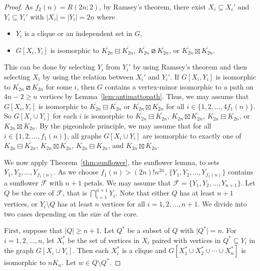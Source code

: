 \documentclass[11pt]{article}
\newcommand\abs[1]{\lvert #1\rvert}
\newcommand\mat{\boxminus}
\newcommand\tri{\boxslash}
\newcommand\antimat{\boxtimes}
\def\K_#1{{K_{#1}}}
\def\S_#1{\overline{K_{#1}}}
\begin{document}
\begin{proof}
    As $f_2(n)=R(2n;2)$, by Ramsey's theorem, there exist $X_i\subseteq X_i'$ and $Y_i\subseteq Y_i'$ with $\abs{X_i}=\abs{Y_i}=2n$ 
	where
	\begin{itemize}
	\item $Y_i$ is a clique or an independent set in $G$, 
        \item $G[X_i, Y_i]$ is isomorphic to $\S_{2n}\mat\S_{2n}$, $\S_{2n}\tri \S_{2n}$, or
     $\S_{2n}\antimat\S_{2n}$.
  \end{itemize}
  This can be done by selecting $Y_i$ from $Y_i'$ by using Ramsey's theorem 
  and then selecting $X_i$ by using the relation between $X_i'$ and $Y_i'$.
	If $G[X_i, Y_i]$ is isomorphic to $\S_{2n}\tri \S_{2n}$ for some $i$, 
	then $G$ contains a vertex-minor isomorphic to a path on $4n-2\ge n$ vertices by Lemma~\ref{lem:antimattopath}.
	Thus, we may assume that 
	$G[X_i, Y_i]$ is isomorphic to $\S_{2n}\mat\S_{2n}$ or
        $\S_{2n}\antimat\S_{2n}$ for all $i\in\{1,2,\ldots,4f_1(n)\}$.
        So $G[X_i\cup Y_i]$ for each $i$ is isomorphic to
        $\K_{2n}\mat\S_{2n}$,
        $\K_{2n}\antimat\S_{2n}$,
        $\K_{2n}\mat\K_{2n}$, or
        $\K_{2n}\antimat\K_{2n}$.
        By the pigeonhole principle, we may assume that
        for all $i\in\{1,2,\ldots,f_1(n)\}$,
        all graphs $G[X_i\cup Y_i]$ are isomorphic to
        exactly one of 
        $\K_{2n}\mat\S_{2n}$,
        $\K_{2n}\antimat\S_{2n}$,
        $\K_{2n}\mat\K_{2n}$, and
        $\K_{2n}\antimat\K_{2n}$.

        
     	We now apply Theorem~\ref{thm:sunflower}, the sunflower lemma, 
        to sets  $Y_1, Y_2, \ldots, Y_{f_1(n)}$.
        As we choose $f_1(n)> (2n)! n^{2n}$, 
        $\{Y_1, Y_2, \ldots, Y_{f_1(n)}\}$ contains a sunflower $\mathcal{F}$ with $n+1$ petals.
        We may assume that $\mathcal F=\{Y_1,Y_2,\ldots,Y_{n+1}\}$.
        Let $Q$ be the core of $\mathcal{F}$, that is $\bigcap_{i=1}^{n+1} Y_i$.
        Note that  
        either $Q$ has at least $n+1$ vertices, 
        or $Y_i\setminus Q$ has at least $n$ vertices for all $i=1,2,\ldots,n+1$.
        We divide into two cases depending on the size of the core.
        
        First, suppose that $\abs{Q}\ge n+1$.
        Let $Q^*$ be a subset of $Q$ with $\abs{Q^*}=n$.
        For $i=1,2,\ldots,n$, let $X_i^*$ be the set of vertices in $X_i$
        paired with vertices in $Q^*\subseteq Y_i$ in the graph $G[X_i\cup Y_i]$.
        Then each $X_i^*$ is a clique and $G[X_1^*\cup X_2^*\cup\cdots\cup
        X_n^*]$ is isomorphic to $nK_n$.
        Let $w\in Q\setminus Q^*$.


\end{proof}
\end{document}
